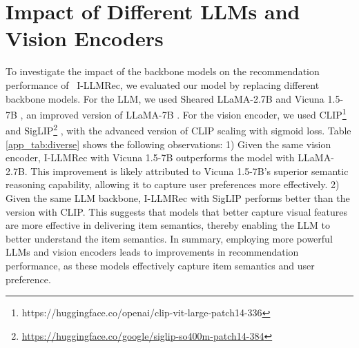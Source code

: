 \documentclass[sigconf]{acmart}
\newcommand{\proposed}{\textsf{I-LLMRec}}
\begin{document}
\begin{table}[h]
\caption{Impact of the different backbones.}
\vspace{-2.0ex}
\label{app_tab:diverse}
\end{table}

\section{Impact of Different LLMs and Vision Encoders}
\label{app_sec:llm_visual}
To investigate the impact of the backbone models on the recommendation performance of ~\proposed{}, we evaluated our model by replacing different backbone models.
For the LLM, we used Sheared LLaMA-2.7B \cite{xia2023sheared} and Vicuna 1.5-7B \cite{chiang2023vicuna}, an improved version of LLaMA-7B \cite{touvron2023llama}. For the vision encoder, we used CLIP\footnote{https://huggingface.co/openai/clip-vit-large-patch14-336} \cite{radford2021learning} and SigLIP\footnote{\url{https://huggingface.co/google/siglip-so400m-patch14-384}} \cite{zhai2023sigmoid}, with the advanced version of CLIP scaling with sigmoid loss.
Table \ref{app_tab:diverse} shows the following observations: 1) Given the same vision encoder, \proposed{} with Vicuna 1.5-7B outperforms the model with LLaMA-2.7B. This improvement is likely attributed to Vicuna 1.5-7B's superior semantic reasoning capability, allowing it to capture user preferences more effectively. 
2) Given the same LLM backbone, \proposed{} with SigLIP performs better than the version with CLIP. This suggests that models that better capture visual features are more effective in delivering item semantics, thereby enabling the LLM to better understand the item semantics.
In summary, employing more powerful LLMs and vision encoders leads to improvements in recommendation performance, as these models effectively capture item semantics and user preference.
\end{document}
